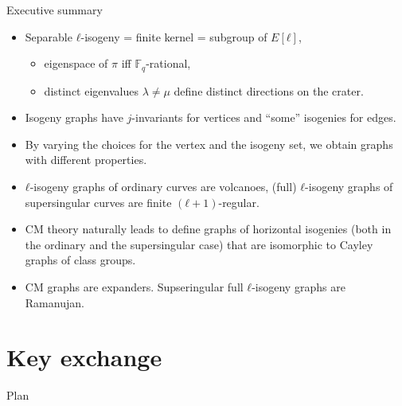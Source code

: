 \documentclass{beamer}
\newcommand{\F}{\mathbb{F}}
\begin{document}

\begin{frame}{Executive summary}
  \begin{itemize}
  \item Separable $ℓ$-isogeny = finite kernel = subgroup of $E[ℓ]$,
    \begin{itemize}
    \item eigenspace of $π$ iff $\F_q$-rational,
    \item distinct eigenvalues $λ≠μ$ define distinct directions on the
      crater.
    \end{itemize}
  \item Isogeny graphs have $j$-invariants for vertices and ``some''
    isogenies for edges.
  \item By varying the choices for the vertex and the isogeny set, we
    obtain graphs with different properties.
  \item $ℓ$-isogeny graphs of ordinary curves are volcanoes, (full)
    $ℓ$-isogeny graphs of supersingular curves are finite
    $(ℓ+1)$-regular.
  \item CM theory naturally leads to define graphs of horizontal
    isogenies (both in the ordinary and the supersingular case) that
    are isomorphic to Cayley graphs of class groups.
  \item CM graphs are expanders. Supseringular full $ℓ$-isogeny graphs
    are Ramanujan.
  \end{itemize}
\end{frame}


\section{Key exchange}

\begin{frame}{Plan}
  \tableofcontents  
\end{frame}

\end{document}
